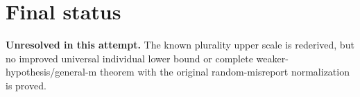 \documentclass[11pt]{article}
\begin{document}
\section{Final status}
\textbf{Unresolved in this attempt.} The known plurality upper scale is rederived, but no improved universal individual lower bound or complete weaker-hypothesis/general-m theorem with the original random-misreport normalization is proved.
\end{document}

